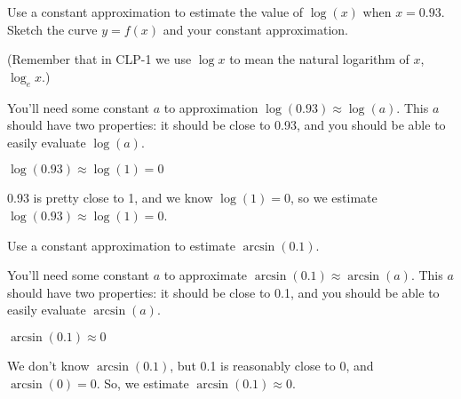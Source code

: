 
\begin{question}\label{s3.4.1startapprox}
Use a constant approximation to estimate the value of $\log(x)$ when $x=0.93$. Sketch the curve $y=f(x)$ and your constant approximation.

(Remember that in CLP-1 we use $\log x$ to mean the natural logarithm of $x$, $\log_e x$.)
\end{question}
\begin{hint}
You'll need some constant $a$ to approximation $\log(0.93) \approx \log(a)$.
This $a$ should have two properties: it should be close to 0.93, and you should be able to easily evaluate $\log(a)$.
\end{hint}
\begin{answer}
$\log(0.93)\approx \log(1)=0$
 \begin{center}\end{center}

\end{answer}
\begin{solution}
 0.93 is pretty close to 1, and we know $\log(1)=0$, so we estimate
 $\log(0.93) \approx \log(1)=0$.
 \begin{center}\end{center}
\end{solution}




\begin{Mquestion}
Use a constant approximation to estimate
$\arcsin(0.1)$.
\end{Mquestion}
\begin{hint}
You'll need some constant $a$ to approximate $\arcsin(0.1) \approx \arcsin(a)$.
This $a$ should have two properties: it should be close to 0.1, and you should be able to easily evaluate $\arcsin(a)$.
\end{hint}
\begin{answer}
$\arcsin(0.1) \approx 0$
\end{answer}
\begin{solution}
We don't know $\arcsin(0.1)$,
but 0.1 is reasonably close to 0, and
$\arcsin(0)=0$. So, we estimate
$\arcsin(0.1) \approx0$.
\end{solution}



